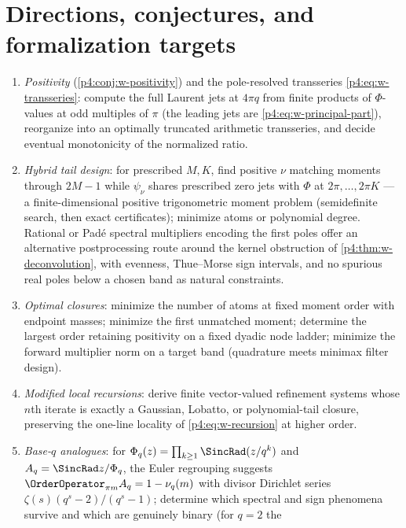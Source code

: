 \documentclass[11pt,oneside]{article}
\numberwithin{equation}{section}
\theoremstyle{definition}
\theoremstyle{remark}
\begin{document}
\section{Directions, conjectures, and formalization targets}
\label{p4:sec:w-directions}

\begin{enumerate}
\item \emph{Positivity} (\cref{p4:conj:w-positivity}) and the pole-resolved
      transseries \eqref{p4:eq:w-transseries}: compute the full Laurent jets
      at $4\pi q$ from finite products of $\Phi$-values at odd multiples
      of $\pi$ (the leading jets are \eqref{p4:eq:w-principal-part}),
      reorganize into an optimally truncated arithmetic transseries, and
      decide eventual monotonicity of the normalized ratio.
\item \emph{Hybrid tail design}: for prescribed $M,K$, find positive
      $\nu$ matching moments through $2M-1$ while $\psi_\nu$ shares
      prescribed zero jets with $\Phi$ at $2\pi,\ldots,2\pi K$ ---
      a finite-dimensional positive trigonometric moment problem
      (semidefinite search, then exact certificates); minimize atoms or
      polynomial degree.  Rational or Pad\'e spectral multipliers encoding
      the first poles offer an alternative postprocessing route around the
      kernel obstruction of \cref{p4:thm:w-deconvolution}, with evenness,
      Thue--Morse sign intervals, and no spurious real poles below a
      chosen band as natural constraints.
\item \emph{Optimal closures}: minimize the number of atoms at fixed
      moment order with endpoint masses; minimize the first unmatched
      moment; determine the largest order retaining positivity on a fixed
      dyadic node ladder; minimize the forward multiplier norm on a target
      band (quadrature meets minimax filter design).
\item \emph{Modified local recursions}: derive finite vector-valued
      refinement systems whose $n$th iterate is exactly a Gaussian,
      Lobatto, or polynomial-tail closure, preserving the one-line
      locality of \eqref{p4:eq:w-recursion} at higher order.
\item \emph{Base-$q$ analogues}: for $\Phi_q(z)=\prod_{k\ge1}\SincRad(z/q^k)$
      and $A_q=\SincRad z/\Phi_q$, the Euler regrouping suggests
      $\OrderOperator_{\pi m}A_q=1-\nu_q(m)$ with divisor Dirichlet series
      $\zeta(s)(q^s-2)/(q^s-1)$; determine which spectral and sign
      phenomena survive and which are genuinely binary (for $q=2$ the

\end{enumerate}
\end{document}
